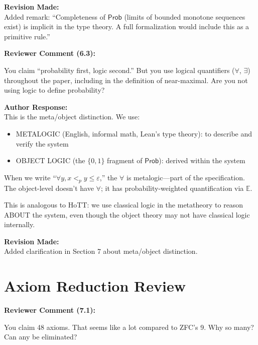 \documentclass[11pt,a4paper]{article}
\newenvironment{review}[1]{%
    \begin{leftbar}
    \textcolor{reviewcolor}{\textbf{Reviewer Comment (#1):}}\\[0.5em]
    \itshape
}{%
    \end{leftbar}
}
\newenvironment{response}{%
    \textcolor{responsecolor}{\textbf{Author Response:}}\\[0.5em]
}{%
    \vspace{1em}
}
\newenvironment{revision}{%
    \textcolor{revisioncolor}{\textbf{Revision Made:}}\\[0.5em]
}{%
    \vspace{1em}
}
\begin{document}
\begin{revision}
Added remark: ``Completeness of $\mathsf{Prob}$ (limits of bounded monotone sequences exist) is implicit in the type theory. A full formalization would include this as a primitive rule.''
\end{revision}

\begin{review}{6.3}
You claim ``probability first, logic second.'' But you use logical quantifiers ($\forall$, $\exists$) throughout the paper, including in the definition of near-maximal. Are you not using logic to define probability?
\end{review}

\begin{response}
This is the meta/object distinction. We use:
\begin{itemize}
    \item METALOGIC (English, informal math, Lean's type theory): to describe and verify the system
    \item OBJECT LOGIC (the $\{0,1\}$ fragment of $\mathsf{Prob}$): derived within the system
\end{itemize}

When we write ``$\forall y, x <_p y \leq \varepsilon$,'' the $\forall$ is metalogic---part of the specification. The object-level doesn't have $\forall$; it has probability-weighted quantification via $\mathbb{E}$.

This is analogous to HoTT: we use classical logic in the metatheory to reason ABOUT the system, even though the object theory may not have classical logic internally.
\end{response}

\begin{revision}
Added clarification in Section 7 about meta/object distinction.
\end{revision}

\section{Axiom Reduction Review}

\begin{review}{7.1}
You claim 48 axioms. That seems like a lot compared to ZFC's 9. Why so many? Can any be eliminated?
\end{review}
\end{document}
